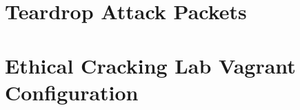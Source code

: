 \documentclass{report}
\begin{document}
\appendix

\chapter{Teardrop Attack Packets}
\label{appendix:packets}


\pagebreak


\chapter{Ethical Cracking Lab Vagrant Configuration}
\label{appendix:vagrant}


\end{document}
